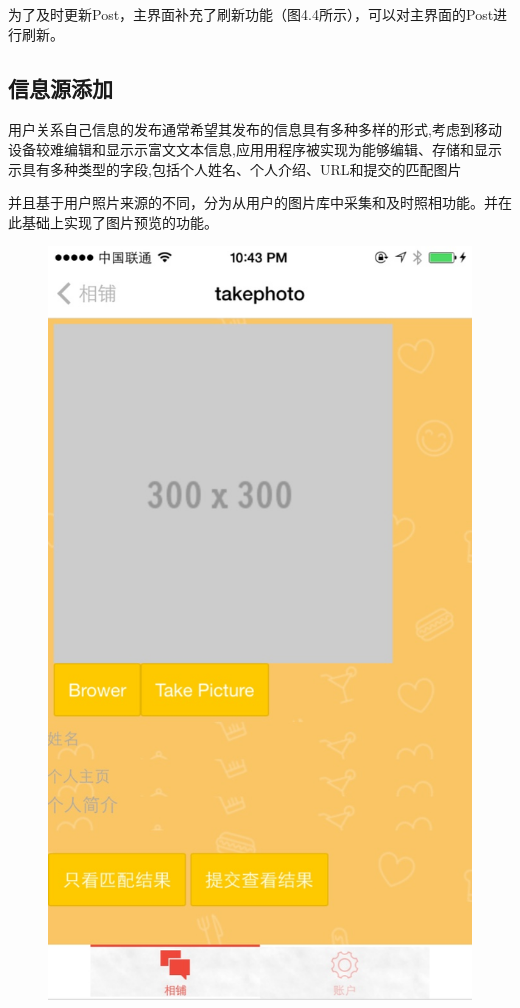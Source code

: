 为了及时更新Post，主界面补充了刷新功能（图4.4所示），可以对主界面的Post进行刷新。

\subsection{信息源添加}
用户关系自己信息的发布通常希望其发布的信息具有多种多样的形式,考虑到移动设备较难编辑和显⽰示富⽂文本信息,应⽤用程序被实现为能够编辑、存储和显⽰示具有多种类型的字段,包括个人姓名、个人介绍、URL和提交的匹配图片

并且基于用户照片来源的不同，分为从用户的图片库中采集和及时照相功能。并在此基础上实现了图片预览的功能。
\begin{figure}[h] 
\begin{minipage}[t]{0.3\linewidth}
\centering
\includegraphics[width=\textwidth]{img/chap4/take1.jpg}

\end{minipage}
\end{figure}
